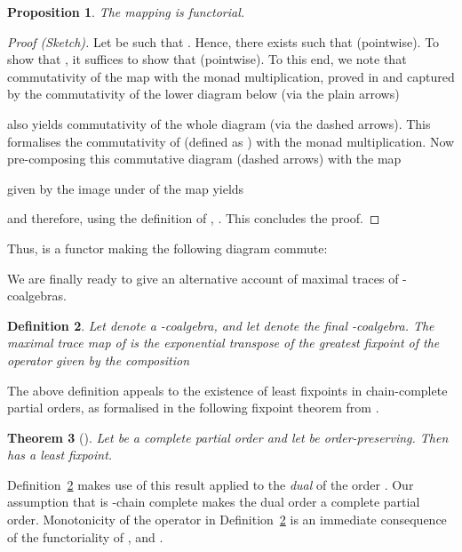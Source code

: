 \documentclass[submission,copyright,creativecommons]{eptcs}
\theoremstyle{plain}\newtheorem{theorem}{Theorem}[section]
\newtheorem{proposition}[theorem]{Proposition}
\newtheorem{definition}[theorem]{Definition}
\theoremstyle{remark}
\begin{document}
\begin{proposition}
\label{prop-functoriality}
The mapping  is functorial.
\end{proposition}
\begin{proof}[Proof (Sketch)]
Let  be such that . Hence, there exists  such that  (pointwise). To show that , it suffices to show that  (pointwise). To this end, we note that commutativity of the map  with the monad multiplication, proved in \cite[Lemma~15\,(iii)]{CoumansJ2011} and captured by the commutativity of the lower diagram below (via the plain arrows)

also yields commutativity of the whole diagram (via the dashed arrows). This formalises the commutativity of  (defined as ) with the monad multiplication. Now pre-composing this commutative diagram (dashed arrows) with the map

given by the image under  of the map  yields

and therefore, using the definition of , . This concludes the proof.
\end{proof}

Thus,  is a functor making the following diagram commute:


We are finally ready to give an alternative account of maximal traces of -coalgebras.

\begin{definition}
\label{max-trace-map}
Let  denote a -coalgebra, and let  denote the final -coalgebra. The \emph{maximal trace map  of } is the exponential transpose of the greatest fixpoint  of the operator  given by the composition

\end{definition}
The above definition appeals to the existence of least fixpoints in chain-complete partial orders, as formalised in the following fixpoint theorem from \cite{Priestley2002}.
\begin{theorem}[{\cite[8.22]{Priestley2002}}]
Let  be a complete partial order and let  be order-preserving. Then  has a least fixpoint.
\end{theorem}
Definition~\ref{max-trace-map} makes use of this result applied to the \emph{dual} of the order . Our assumption that  is -chain complete makes the dual order a complete partial order. Monotonicity of the operator in Definition~\ref{max-trace-map} is an immediate consequence of the functoriality of ,  and .
\end{document}
